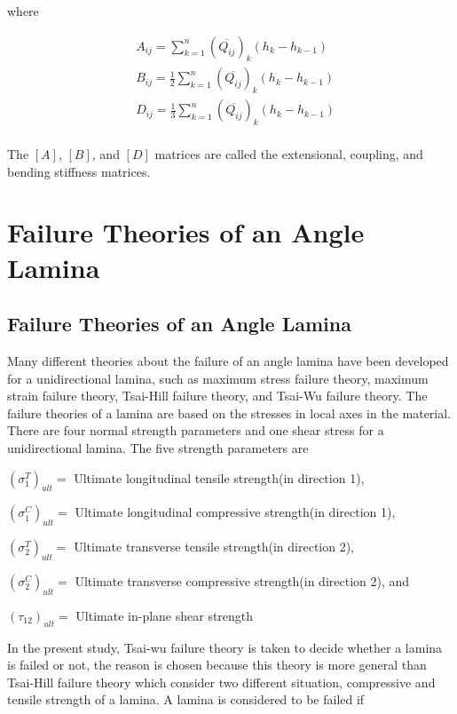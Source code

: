 \documentclass[smallextended]{svjour3}       %
\begin{document}
where

\begin{equation}
    \begin{split}
    &A_{ij}
	=
	\sum_{k=1}^n(\overline{Q_{ij}})_k(h_k-h_{k-1}) \\
    &B_{ij}
	=
	\frac{1}{2}\sum_{k=1}^n(\overline{Q_{ij}})_k(h_k-h_{k-1}) \\
    &D_{ij}
	=
	\frac{1}{3}\sum_{k=1}^n(\overline{Q_{ij}})_k(h_k-h_{k-1}) \\
    \end{split}
\end{equation}

The $[A]$, $[B]$, and $[D]$ matrices are called the extensional, coupling, and bending stiffness
matrices.



\section{Failure Theories of an Angle Lamina}
\subsection{Failure Theories of an Angle Lamina}
Many different theories about the failure of an angle lamina have been developed for a
unidirectional lamina, such as maximum stress failure theory, maximum strain failure theory,
Tsai-Hill failure theory, and Tsai-Wu failure theory. The failure theories of a lamina are based on
the stresses in local axes in the material. There are four normal strength parameters and one shear
stress for a unidirectional lamina. The five strength parameters are

\vspace{3mm}

$(\sigma_1^T)_{ult}=$ Ultimate longitudinal tensile strength(in direction 1),

$(\sigma_1^C)_{ult}=$ Ultimate longitudinal compressive strength(in direction 1),

$(\sigma_2^T)_{ult}=$ Ultimate transverse tensile strength(in direction 2),

$(\sigma_2^C)_{ult}=$ Ultimate transverse compressive strength(in direction 2), and

$(\tau_{12})_{ult}=$ Ultimate in-plane shear strength

\vspace{3mm}

In the present study, Tsai-wu failure theory is taken to decide whether a lamina is failed or not, the
reason is chosen because this theory is  more general than Tsai-Hill failure theory which consider
two different situation, compressive and tensile strength of a lamina. A lamina is considered to be
failed if
\end{document}
